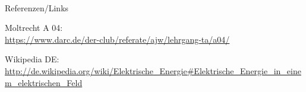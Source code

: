 

\renewcommand{\refname}{Referenzen}

\hypertarget{refs}{}
\textcolor{white}{} \\ %
\Large Referenzen/Links
\footnotesize

\begin{thebibliography}{}
     Moltrecht A 04: \\
    \url{https://www.darc.de/der-club/referate/ajw/lehrgang-ta/a04/}

      Wikipedia DE: \\
    \url{http://de.wikipedia.org/wiki/Elektrische_Energie#Elektrische_Energie_in_einem_elektrischen_Feld}

\end{thebibliography}


